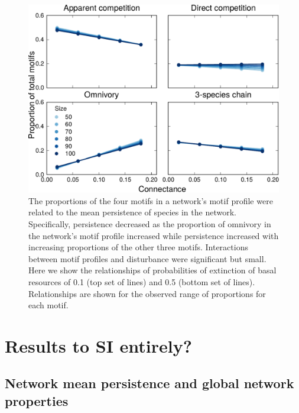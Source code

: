 \documentclass[12pt]{article}
\begin{document}
\begin{spacing}{2.0}
        \begin{figure}[h!]
            \centering
            \includegraphics[width=.75\textwidth]{manuscript/figures/motif_proportion_lms.pdf}
            \caption{The proportions of the four motifs in a network's motif profile were related to the mean persistence of species in the network. Specifically, persistence decreased as the proportion of omnivory in the network's motif profile increased while persistence increased with increasing proportions of the other three motifs. Interactions between motif profiles and disturbance were significant but small. Here we show the relationships of probabilities of extinction of basal resources of 0.1 (top set of lines) and 0.5 (bottom set of lines). Relationships are shown for the observed range of proportions for each motif.}
            \label{motif_proportion_lms}
        \end{figure}


     \clearpage

\section*{Results to SI entirely?}

    \subsection*{Network mean persistence and global network properties}
    



\end{spacing}
\end{document}
